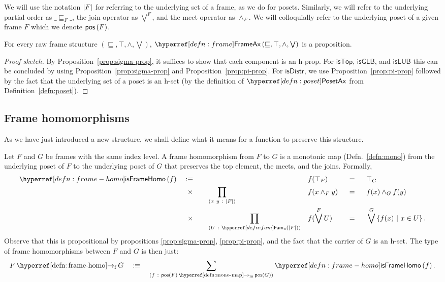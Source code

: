 We will use the notation $\left| F \right|$ for referring to the underlying set of a frame, as we
do for posets. Similarly, we will refer to the underlying partial order as $\_\sqsubseteq_F\_$, the
join operator as $\bigvee^F$, and the meet operator as $\wedge_F$. We will colloquially refer to the
underlying poset of a given frame $F$ which we denote $\mathsf{pos}\left(F\right)$.

\begin{prop}\label{prop:frame-ax-prop}
  For every raw frame structure $(\sqsubseteq, \top, \wedge, \bigvee)$, $\frameax{\sqsubseteq, \top, \wedge, \bigvee}$ is a proposition.
\end{prop}
\begin{proof}[Proof sketch]
  By Proposition~\ref{prop:sigma-prop}, it suffices to show that each component is an
  h-prop. For $\mathsf{isTop}$, $\mathsf{isGLB}$, and $\mathsf{isLUB}$ this can be
  concluded by using Proposition~\ref{prop:sigma-prop} and Proposition~\ref{prop:pi-prop}.
  For $\mathsf{isDistr}$, we use Proposition~\ref{prop:pi-prop} followed by the fact that
  the underlying set of a poset is an h-set (by the definition of $\posetaxnm{}$ from
  Definition~\ref{defn:poset}).
\end{proof}

\subsection{Frame homomorphisms}

As we have just introduced a new structure, we shall define what it means for a function
to preserve this structure.

\begin{defn}\label{defn:frame-homo}
  Let $F$ and $G$ be frames with the same index level. A frame homomorphism from $F$ to
  $G$ is a monotonic map (Defn.~\ref{defn:mono}) from the underlying poset of $F$ to the
  underlying poset of $G$ that preserves the top element, the meets, and the joins.
  Formally,
  \begin{alignat*}{5}
    \isframehomo{f} \quad&\is\quad && &&f(\top_F) &&\idnm{} &&\top_G \\
      &\hspace{0.55em}\times\quad  &&\pity{x~y}{\abs{F}}{&&f(x \wedge_F y) &&\idnm{} &&f(x) \wedge_G f(y)} \\
      &\hspace{0.55em}\times\quad  &&\pity{U}{\sub{o}{\abs{F}}}{&&f(\bigvee^F U) &&\idnm{} &&\bigvee^G \setof{ f(x) ~|~ x \in U }}.
  \end{alignat*}
  Observe that this is propositional by propositions \ref{prop:sigma-prop},
  \ref{prop:pi-prop}, and the fact that the carrier of $G$ is an h-set. The type of frame
  homomorphisms between $F$ and $G$ is then just:
  \begin{equation*}
    \framehomo{F}{G} \quad\is\quad \sigmaty{f}{\mono{\posof{F}}{\posof{G}}}{\isframehomo{f}}.
  \end{equation*}
\end{defn}

